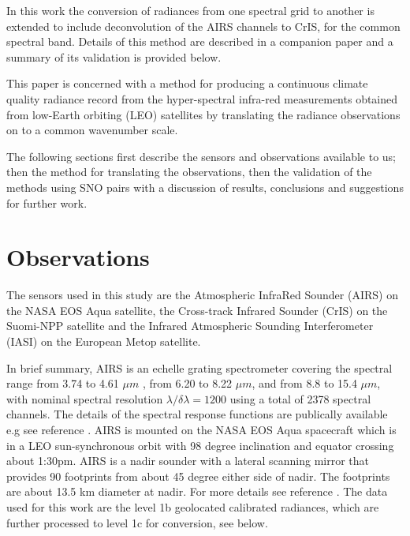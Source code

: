 \documentclass[11pt]{article}
\begin{document}
In this work the conversion of radiances from one spectral grid to another is extended to include deconvolution of the AIRS channels to CrIS, for the common spectral band. Details of this method are described in a companion paper \cite{Motteler2017a} and a summary of its validation is provided below. 

This paper is concerned with a method for producing a continuous climate quality radiance record from the hyper-spectral infra-red measurements obtained from low-Earth orbiting (LEO) satellites by translating the radiance observations on to a common wavenumber scale.

The following sections first describe the sensors and observations available to us; then the method for translating the observations, then the validation of the methods using SNO pairs with a discussion of results, conclusions and suggestions for further work.

\section{Observations}
\label{sec:orgheadline3}

The sensors used in this study are the Atmospheric InfraRed Sounder (AIRS) on the NASA EOS Aqua satellite, the Cross-track Infrared Sounder (CrIS) on the Suomi-NPP satellite and the Infrared Atmospheric Sounding Interferometer (IASI) on the European Metop satellite.

In brief summary, AIRS is an echelle grating spectrometer covering the spectral range from 3.74 to 4.61 \(\mu m\) , from 6.20 to 8.22 \(\mu m\), and from 8.8 to 15.4 \(\mu m\), with nominal spectral resolution \(\lambda/\delta\lambda= 1200\) using a total of 2378 spectral channels. The details of the spectral response functions are publically available e.g see reference \cite{airscalib}. AIRS is mounted on the NASA EOS Aqua spacecraft which is in a LEO sun-synchronous orbit with 98 degree inclination and equator crossing about 1:30pm. AIRS is a nadir sounder with a lateral scanning mirror that provides 90 footprints from about 45 degree either side of nadir. The footprints are about 13.5 km diameter at nadir. For more details see reference \cite{airseos}. The data used for this work are the level 1b geolocated calibrated radiances, which are further processed to level 1c for conversion, see below.
\end{document}
